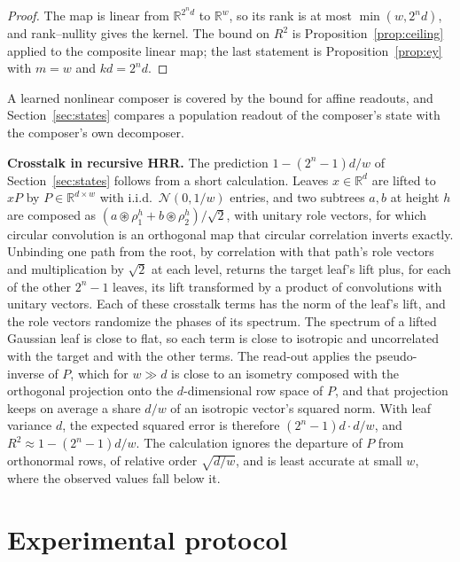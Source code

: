 \documentclass[10pt]{article}
\theoremstyle{plain}
\theoremstyle{remark}
\newcommand{\R}{\mathbb{R}}
\begin{document}
\begin{proof}
The map is linear from $\R^{2^n d}$ to $\R^w$, so its rank is at most $\min(w, 2^n d)$, and rank--nullity gives the kernel. The bound on $R^2$ is Proposition~\ref{prop:ceiling} applied to the composite linear map; the last statement is Proposition~\ref{prop:ey} with $m = w$ and $kd = 2^n d$.
\end{proof}

\noindent
A learned nonlinear composer is covered by the bound for affine readouts, and Section~\ref{sec:states} compares a population readout of the composer's state with the composer's own decomposer.

\noindent
\textbf{Crosstalk in recursive HRR.} The prediction $1 - (2^n - 1)d/w$ of Section~\ref{sec:states} follows from a short calculation. Leaves $x \in \R^d$ are lifted to $xP$ by $P \in \R^{d \times w}$ with i.i.d.\ $\mathcal{N}(0, 1/w)$ entries, and two subtrees $a, b$ at height $h$ are composed as $(a \circledast \rho^h_1 + b \circledast \rho^h_2)/\sqrt{2}$, with unitary role vectors, for which circular convolution is an orthogonal map that circular correlation inverts exactly. Unbinding one path from the root, by correlation with that path's role vectors and multiplication by $\sqrt{2}$ at each level, returns the target leaf's lift plus, for each of the other $2^n - 1$ leaves, its lift transformed by a product of convolutions with unitary vectors. Each of these crosstalk terms has the norm of the leaf's lift, and the role vectors randomize the phases of its spectrum. The spectrum of a lifted Gaussian leaf is close to flat, so each term is close to isotropic and uncorrelated with the target and with the other terms. The read-out applies the pseudo-inverse of $P$, which for $w \gg d$ is close to an isometry composed with the orthogonal projection onto the $d$-dimensional row space of $P$, and that projection keeps on average a share $d/w$ of an isotropic vector's squared norm. With leaf variance $d$, the expected squared error is therefore $(2^n - 1)d \cdot d/w$, and $R^2 \approx 1 - (2^n - 1)d/w$. The calculation ignores the departure of $P$ from orthonormal rows, of relative order $\sqrt{d/w}$, and is least accurate at small $w$, where the observed values fall below it.

\section{Experimental protocol}
\label{app:protocol}
\end{document}
